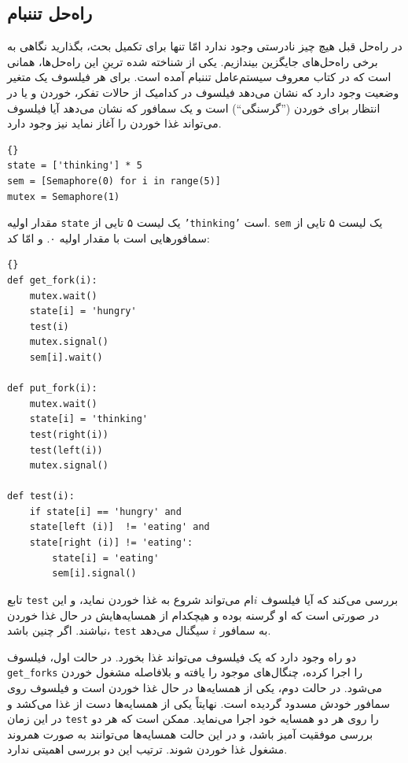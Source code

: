 \documentclass{book}
\newcommand{\clearemptydoublepage}{}%
\begin{document}
\clearemptydoublepage
\subsection{راه‌حل تننبام}

    در راه‌حل قبل هیچ چیز نادرستی وجود ندارد امّا تنها برای تکمیل بحث، بگذارید نگاهی به برخی راه‌حل‌های جایگزین بیندازیم. 
    یکی از شناخته‌ شده ترینِ  این راه‌حل‌ها، همانی است که در کتاب معروف سیستم‌عامل تننبام آمده است\cite{tanenbaum}. 
    برای هر فیلسوف یک متغیر وضعیت وجود دارد که نشان می‌دهد فیلسوف در کدامیک از حالات تفکر، 
    خوردن و یا در انتظار برای خوردن (''گرسنگی``) است و 
    یک سمافور که نشان می‌دهد آیا فیلسوف می‌تواند غذا خوردن را آغاز نماید نیز وجود دارد. 

\begin{latin}
\begin{lstlisting}[title=\rl{متغیرهای راه‌حل تننبام}]{}
state = ['thinking'] * 5
sem = [Semaphore(0) for i in range(5)]
mutex = Semaphore(1)
\end{lstlisting}
\end{latin}

    مقدار اولیه {\tt state} یک لیست ۵ تایی از {\tt 'thinking'} است.     {\tt sem}
    یک لیست ۵ تایی از سمافورهایی است با مقدار اولیه ۰. 
    و امّا کد: 

\begin{latin}
\begin{lstlisting}[title=\rl{ راه‌حل تننبام}]{}
def get_fork(i):
    mutex.wait()
    state[i] = 'hungry'
    test(i)
    mutex.signal()
    sem[i].wait()

def put_fork(i):
    mutex.wait()
    state[i] = 'thinking'
    test(right(i))
    test(left(i))
    mutex.signal()

def test(i):
    if state[i] == 'hungry' and
    state[left (i)]  != 'eating' and
    state[right (i)] != 'eating':
        state[i] = 'eating'
        sem[i].signal()
\end{lstlisting}
\end{latin}


    تابع {\tt test}  بررسی می‌کند که آیا فیلسوف $i$ام می‌تواند شروع به غذا خوردن نماید، و این در صورتی است که 
    او گرسنه بوده و هیچکدام از همسایه‌هایش در حال غذا خوردن نباشند. اگر چنین باشد، {\tt test} به سمافور $i$ سیگنال می‌دهد. 
    
    دو راه وجود دارد که یک فیلسوف می‌تواند غذا بخورد. در حالت اول، فیلسوف {\tt get\_forks} را اجرا کرده، 
    چنگال‌های موجود را یافته و 
    بلافاصله مشغول خوردن می‌شود. در حالت دوم، یکی از همسایه‌ها در حال غذا خوردن است 
    و فیلسوف روی سمافور خودش مسدود گردیده است. 
    نهایتاً یکی از همسایه‌ها دست از غذا می‌کشد و در این زمان  {\tt test} را روی هر دو همسایه خود اجرا می‌نماید. 
    ممکن است که هر دو بررسی موفقیت آمیز باشد، و در این حالت همسایه‌ها می‌توانند به صورت همروند مشغول غذا خوردن شوند. 
    ترتیب این دو بررسی اهمیتی ندارد. 
\end{document}
